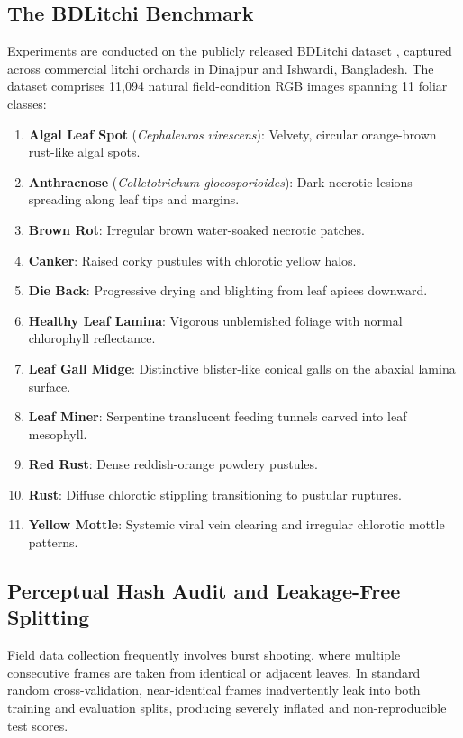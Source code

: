 \documentclass[journal]{IEEEtran}
\begin{document}
\subsection{The BDLitchi Benchmark}
Experiments are conducted on the publicly released BDLitchi dataset \cite{litchi_dataset_2022}, captured across commercial litchi orchards in Dinajpur and Ishwardi, Bangladesh. The dataset comprises 11,094 natural field-condition RGB images spanning 11 foliar classes:
\begin{enumerate}
    \item \textbf{Algal Leaf Spot} (\textit{Cephaleuros virescens}): Velvety, circular orange-brown rust-like algal spots.
    \item \textbf{Anthracnose} (\textit{Colletotrichum gloeosporioides}): Dark necrotic lesions spreading along leaf tips and margins.
    \item \textbf{Brown Rot}: Irregular brown water-soaked necrotic patches.
    \item \textbf{Canker}: Raised corky pustules with chlorotic yellow halos.
    \item \textbf{Die Back}: Progressive drying and blighting from leaf apices downward.
    \item \textbf{Healthy Leaf Lamina}: Vigorous unblemished foliage with normal chlorophyll reflectance.
    \item \textbf{Leaf Gall Midge}: Distinctive blister-like conical galls on the abaxial lamina surface.
    \item \textbf{Leaf Miner}: Serpentine translucent feeding tunnels carved into leaf mesophyll.
    \item \textbf{Red Rust}: Dense reddish-orange powdery pustules.
    \item \textbf{Rust}: Diffuse chlorotic stippling transitioning to pustular ruptures.
    \item \textbf{Yellow Mottle}: Systemic viral vein clearing and irregular chlorotic mottle patterns.
\end{enumerate}

\subsection{Perceptual Hash Audit and Leakage-Free Splitting}
Field data collection frequently involves burst shooting, where multiple consecutive frames are taken from identical or adjacent leaves. In standard random cross-validation, near-identical frames inadvertently leak into both training and evaluation splits, producing severely inflated and non-reproducible test scores.
\end{document}
